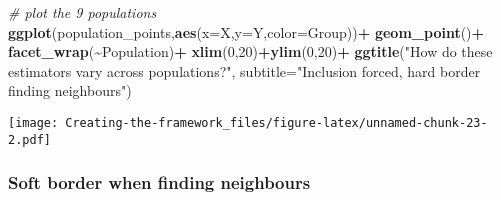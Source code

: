 \documentclass[
]{article}
\newenvironment{Shaded}{\begin{snugshade}}{\end{snugshade}}
\newcommand{\AttributeTok}[1]{\textcolor[rgb]{0.13,0.29,0.53}{#1}}
\newcommand{\CommentTok}[1]{\textcolor[rgb]{0.56,0.35,0.01}{\textit{#1}}}
\newcommand{\DecValTok}[1]{\textcolor[rgb]{0.00,0.00,0.81}{#1}}
\newcommand{\FunctionTok}[1]{\textcolor[rgb]{0.13,0.29,0.53}{\textbf{#1}}}
\newcommand{\NormalTok}[1]{#1}
\newcommand{\SpecialCharTok}[1]{\textcolor[rgb]{0.81,0.36,0.00}{\textbf{#1}}}
\newcommand{\StringTok}[1]{\textcolor[rgb]{0.31,0.60,0.02}{#1}}
\begin{document}
\begin{Shaded}
\begin{Highlighting}[]
\CommentTok{\# plot the 9 populations}
\FunctionTok{ggplot}\NormalTok{(population\_points,}\FunctionTok{aes}\NormalTok{(}\AttributeTok{x=}\NormalTok{X,}\AttributeTok{y=}\NormalTok{Y,}\AttributeTok{color=}\NormalTok{Group))}\SpecialCharTok{+}
  \FunctionTok{geom\_point}\NormalTok{()}\SpecialCharTok{+}
  \FunctionTok{facet\_wrap}\NormalTok{(}\SpecialCharTok{\textasciitilde{}}\NormalTok{Population)}\SpecialCharTok{+}
  \FunctionTok{xlim}\NormalTok{(}\DecValTok{0}\NormalTok{,}\DecValTok{20}\NormalTok{)}\SpecialCharTok{+}\FunctionTok{ylim}\NormalTok{(}\DecValTok{0}\NormalTok{,}\DecValTok{20}\NormalTok{)}\SpecialCharTok{+}
  \FunctionTok{ggtitle}\NormalTok{(}\StringTok{"How do these estimators vary across populations?"}\NormalTok{,}
          \AttributeTok{subtitle=}\StringTok{"Inclusion forced, hard border finding neighbours"}\NormalTok{)}
\end{Highlighting}
\end{Shaded}

\texttt{[image: Creating-the-framework\_files/figure-latex/unnamed-chunk-23-2.pdf]}

\subsubsection{Soft border when finding
neighbours}\label{soft-border-when-finding-neighbours-1}
\end{document}

